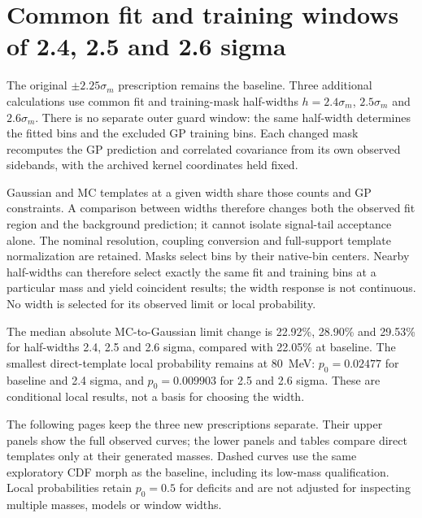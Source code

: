 \clearpage
\section{Common fit and training windows of 2.4, 2.5 and 2.6 sigma}
The original $\pm2.25\sigma_m$ prescription remains the baseline. Three
additional calculations use common fit and training-mask half-widths
$h=2.4\sigma_m$, $2.5\sigma_m$ and $2.6\sigma_m$. There is no separate
outer guard window: the same half-width determines the fitted bins and
the excluded GP training bins. Each changed mask recomputes the GP
prediction and correlated covariance from its own observed sidebands,
with the archived kernel coordinates held fixed.

Gaussian and MC templates at a given width share those counts and GP
constraints. A comparison between widths therefore changes both the
observed fit region and the background prediction; it cannot isolate
signal-tail acceptance alone. The nominal resolution, coupling conversion
and full-support template normalization are retained. Masks select bins by their native-bin centers. Nearby half-widths
can therefore select exactly the same fit and training bins at a particular
mass and yield coincident results; the width response is not continuous. No width is selected for
its observed limit or local probability.

\begin{table}[H]\centering\scriptsize

\caption{Direct-MC versus Gaussian comparisons at ten generated masses,
reported separately for each common half-width. The LOO column counts
held-out shape checks satisfying the declared criteria. MC spread is
the largest relative upper-limit standard deviation among the ten
masses under 32 independent-bin Poisson resamples. These descriptions
are correlated across both mass and window.}
\end{table}

The median absolute MC-to-Gaussian limit change is 22.92\%, 28.90\%
and 29.53\% for half-widths 2.4, 2.5 and 2.6 sigma, compared with
22.05\% at baseline. The smallest direct-template local probability
remains at 80~MeV: $p_0=0.02477$ for baseline and 2.4 sigma, and
$p_0=0.009903$ for 2.5 and 2.6 sigma. These are conditional local
results, not a basis for choosing the width.

The following pages keep the three new prescriptions separate. Their
upper panels show the full observed curves; the lower panels and tables
compare direct templates only at their generated masses. Dashed curves
use the same exploratory CDF morph as the baseline, including its
low-mass qualification. Local probabilities retain $p_0=0.5$ for
deficits and are not adjusted for inspecting multiple masses, models
or window widths.

